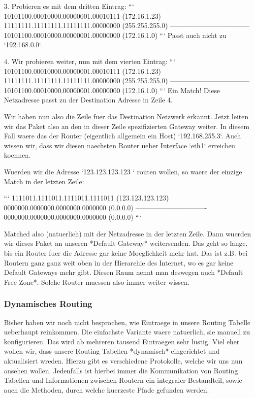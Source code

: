 3. Probieren es mit dem dritten Eintrag:
   ```
   10101100.00010000.00000001.00010111 (172.16.1.23)
   11111111.11111111.11111111.00000000 (255.255.255.0)
   -----------------------------------
   10101100.00010000.00000001.00000000 (172.16.1.0)
   ```
   Passt auch nicht zu `192.168.0.0`.

4. Wir probieren weiter, nun mit dem vierten Eintrag:
   ```
   10101100.00010000.00000001.00010111 (172.16.1.23)
   11111111.11111111.11111111.00000000 (255.255.255.0)
   -----------------------------------
   10101100.00010000.00000001.00000000 (172.16.1.0)
   ```
   Ein Match! Diese Netzadresse passt zu der Destination Adresse in Zeile 4.

Wir haben nun also die Zeile fuer das Destination Netzwerk erkannt. Jetzt leiten
wir das Paket also an den in dieser Zeile spezifizierten Gateway weiter. In
diesem Fall waere das der Router (eigentlich allgemein ein Host)
`192.168.255.3`. Auch wissen wir, dass wir diesen naechsten Router ueber
Interface `eth1` erreichen koennen.

Wuerden wir die Adresse `123.123.123.123 ` routen wollen, so waere der einzige
Match in der letzten Zeile:

```
1111011.1111011.1111011.1111011 (123.123.123.123)
0000000.0000000.0000000.0000000 (0.0.0.0)
-------------------------------
0000000.0000000.0000000.0000000 (0.0.0.0)
```

Matched also (natuerlich) mit der Netzadresse in der letzten Zeile. Dann wuerden
wir dieses Paket an unseren *Default Gateway* weitersenden. Das geht so lange,
bis ein Router fuer die Adresse gar keine Moeglichkeit mehr hat. Das ist
z.B. bei Routern ganz ganz weit oben in der Hierarchie des Internet, wo es gar
keine Default Gateways mehr gibt. Diesen Raum nennt man deswegen auch *Default
Free Zone*. Solche Router muessen also immer weiter wissen.

\subsubsection{Dynamisches Routing} 

Bisher haben wir noch nicht besprochen, wie Eintraege in unsere Routing Tabelle
ueberhaupt reinkommen. Die einfachste Variante waere natuerlich, sie manuell zu
konfigurieren. Das wird ab mehreren tausend Eintraegen sehr lustig. Viel eher
wollen wir, dass unsere Routing Tabellen *dynamisch* eingerichtet und
aktualisiert wreden. Hierzu gibt es verschiedene Protokolle, welche wir uns nun
ansehen wollen. Jedenfalls ist hierbei immer die Kommunikation von Routing
Tabellen und Informationen zwischen Routern ein integraler Bestandteil, sowie
auch die Methoden, durch welche kuerzeste Pfade gefunden werden.

